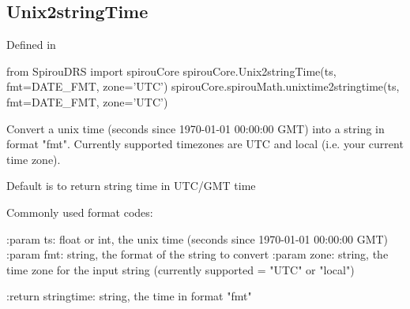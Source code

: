 \noindent\begin{minipage}{\textwidth}
\subsection{Unix2stringTime}

Defined in \spirouCore{}

\begin{pythonbox}
from SpirouDRS import spirouCore
spirouCore.Unix2stringTime(ts, fmt=DATE_FMT, zone='UTC')
spirouCore.spirouMath.unixtime2stringtime(ts, fmt=DATE_FMT, zone='UTC')
\end{pythonbox}

\begin{pythondocstring}
Convert a unix time (seconds since  1970-01-01 00:00:00 GMT) into a
string in format "fmt". Currently supported timezones are UTC and local
(i.e. your current time zone).

Default is to return string time in UTC/GMT time

Commonly used format codes:


:param ts: float or int, the unix time (seconds since 1970-01-01 00:00:00
           GMT)
:param fmt: string, the format of the string to convert
:param zone: string, the time zone for the input string
                      (currently supported =  "UTC" or "local")

:return stringtime: string, the time in format "fmt"
\end{pythondocstring}
\end{minipage}


